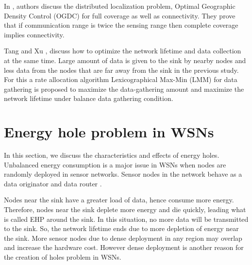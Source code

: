 \documentclass{article}
\begin{document}
In \cite{5}, authors discuss the distributed localization problem, Optimal Geographic Density Control (OGDC) for full coverage as well as connectivity. They prove that if communication range is twice the sensing range then complete coverage implies connectivity.

Tang and Xu \cite{2}, discuss how to optimize the network lifetime and data collection at the same time. Large amount of data is given to the sink by nearby nodes and less data from the nodes that are far away from the sink in the previous study. For this a rate allocation algorithm Lexicographical Max-Min (LMM) for data gathering is proposed to maximize the data-gathering amount and maximize the network lifetime under balance data gathering condition.

\section{Energy hole problem in WSNs}
\label{sec:pagestyle}
In this section, we discuss the characteristics and effects of energy holes. Unbalanced energy consumption is a major issue in WSNs when nodes are randomly deployed in sensor networks. Sensor nodes in the network behave as a data originator and data router \cite{6}.

Nodes near the sink have a greater load of data, hence consume more energy. Therefore, nodes near the sink deplete more energy and die quickly, leading what is called EHP around the sink. In this situation, no more data will be transmitted to the sink. So, the network lifetime ends due to more depletion of energy near the sink. More sensor nodes due to dense deployment in any region may overlap and increase the hardware cost. However dense deployment is another reason for the creation of holes problem in WSNs.\\ 
\end{document}
